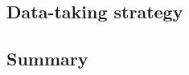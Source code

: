 \documentclass[../report.tex]{subfiles}
\begin{document}
\subsection{Data-taking strategy}


\subsection{Summary}



\end{document}

